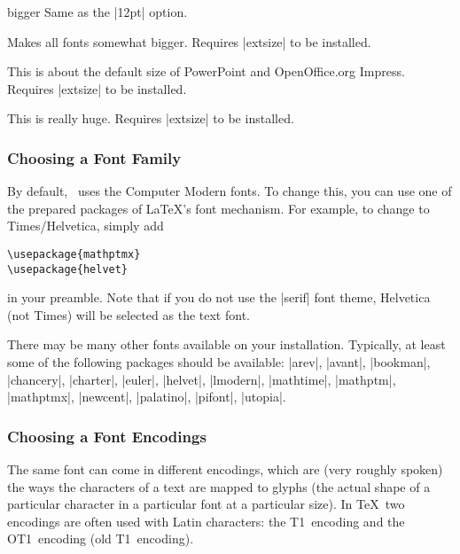 \begin{classoption}{bigger}
  Same as the |12pt| option.
\end{classoption}

\begin{classoption}{14pt}
  Makes all fonts somewhat bigger. Requires |extsize| to be installed.
\end{classoption}

\begin{classoption}{17pt}
  This is about the default size of PowerPoint and OpenOffice.org Impress. Requires |extsize| to be installed.
\end{classoption}

\begin{classoption}{20pt}
  This is really huge. Requires |extsize| to be installed.
\end{classoption}

\subsubsection{Choosing a Font Family}

\label{section-substition}

By default, \beamer\ uses the Computer Modern fonts. To change this, you can use one of the prepared packages of \LaTeX's font mechanism. For example, to change to Times/Helvetica, simply add
\begin{verbatim}
\usepackage{mathptmx}
\usepackage{helvet}
\end{verbatim}
in your preamble. Note that if you do not use the |serif| font theme, Helvetica (not Times) will be selected as the text font.

There may be many other fonts available on your installation. Typically, at least some of the following packages should be available: |arev|, |avant|, |bookman|, |chancery|, |charter|, |euler|, |helvet|, |lmodern|, |mathtime|, |mathptm|, |mathptmx|, |newcent|, |palatino|, |pifont|, |utopia|.

\subsubsection{Choosing a Font Encodings}
\label{section-font-encoding}

The same font can come in different encodings, which are (very roughly spoken) the ways the characters of a text are mapped to glyphs (the actual shape of a particular character in a particular font at a particular size). In \TeX\ two encodings are often used with Latin characters: the T1~encoding and the OT1~encoding (old T1~encoding).

